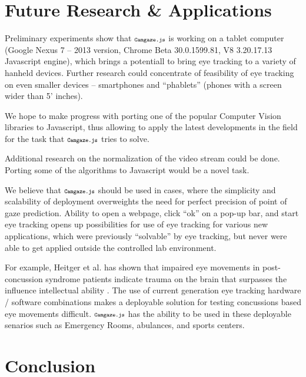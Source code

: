 \documentclass[annual]{acmsiggraph}
\newcommand{\Acronym}[1]{\ensuremath{{\small{\texttt{#1}}}}}
\newcommand{\Name}{\Acronym{Camgaze.js}} \newcommand{\False}{\Constant{false}}
\newcommand{\Constant}[1]{\ensuremath{\small{\texttt{#1}}}}
\begin{document}

\section{Future Research \& Applications}

Preliminary experiments show that $\Name$ is working on a tablet computer
(Google Nexus 7 -- 2013 version, Chrome Beta 30.0.1599.81, V8 3.20.17.13
Javascript engine), which brings a potentiall to bring eye tracking to a
variety of hanheld devices. Further research could concentrate of feasibility
of eye tracking on even smaller devices -- smartphones and “phablets” (phones
with a screen wider than 5’ inches).

We hope to make progress with porting one of the popular Computer Vision
libraries to Javascript, thus allowing to apply the latest developments in the
field for the task that $\Name$ tries to solve.

Additional research on the normalization of the video stream could be done.
Porting some of the algorithms to Javascript would be a novel task.

We believe that $\Name$ should be used in cases, where the simplicity and
scalability of deployment overweights the need for perfect precision of point
of gaze prediction. Ability to open a webpage, click “ok” on a pop-up bar, and
start eye tracking opens up possibilities for use of eye tracking for various
new applications, which were previously “solvable” by eye tracking, but never
were able to get applied outside the controlled lab environment.

For example, Heitger et al. has shown that impaired eye movements in
post-concussion syndrome patients indicate trauma on the brain that surpasses
the influence intellectual ability \cite{Heitger2009}. The use of current
generation eye tracking hardware / software combinations makes a deployable
solution for testing concussions based eye movements difficult. $\Name$ has the
ability to be used in these deployable senarios such as Emergency Rooms,
abulances, and sports centers.

\section{Conclusion}
\end{document}
